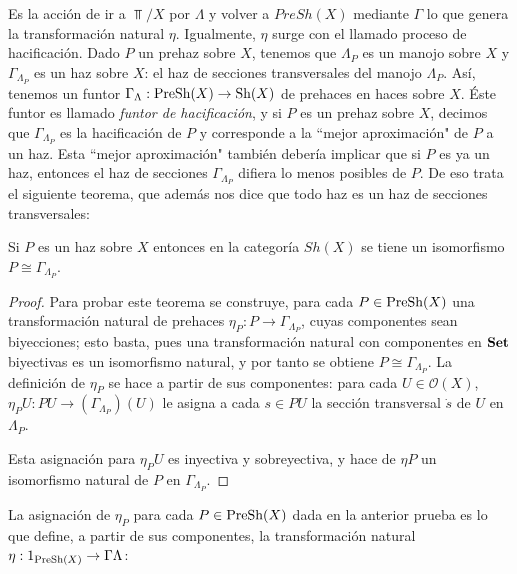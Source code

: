 Es la acción de ir a $\Top/X$ por $\Lambda$ y volver a $PreSh(X)$ mediante $\Gamma$ lo que genera la transformación natural $\eta$. Igualmente, $\eta$ surge con el llamado proceso de hacificación. Dado $P$ un prehaz sobre $X$, tenemos que $\Lambda_P$ es un manojo sobre $X$ y $\Gamma_{\Lambda_P}$ es un haz sobre $X$: el haz de secciones transversales del manojo $\Lambda_P$. Así, tenemos un funtor $\Gamma_\Lambda: \normalfont{\text{PreSh}}(X)\to\normalfont{\text{Sh}}(X)$ de prehaces en haces sobre $X$. Éste funtor es llamado \textit{funtor de hacificación}, y si $P$ es un prehaz sobre $X$, decimos que $\Gamma_{\Lambda_P}$ es la hacificación de $P$ y corresponde a la ``mejor aproximación" de $P$ a un haz. Esta ``mejor aproximación" también debería implicar que si $P$ es ya un haz, entonces el haz de secciones $\Gamma_{\Lambda_P}$ difiera lo menos posibles de $P$. De eso trata el siguiente teorema, que además nos dice que todo haz es un haz de secciones transversales:
\begin{Tma}
   Si $P$ es un haz sobre $X$ entonces en la categoría $Sh(X)$ se tiene un isomorfismo $P\cong \Gamma_{\Lambda_P}$.
\end{Tma}
\begin{proof}
   Para probar este teorema se construye, para cada $P\in \normalfont{\text{PreSh}}(X)$ una transformación natural de prehaces $\eta_{P}:P\to\Gamma_{\Lambda_P}$, cuyas componentes sean biyecciones; esto basta, pues una transformación natural con componentes en $\normalfont{\textbf{Set}}$ biyectivas es un isomorfismo natural, y por tanto se obtiene $P\cong \Gamma_{\Lambda_P}$. La definición de $\eta_P$ se hace a partir de sus componentes: para cada $U\in \mathcal{O}(X)$, $\eta_{P} U:PU\to (\Gamma_{\Lambda_P})(U)$ le asigna a cada $s\in PU$ la sección transversal $\dot{s}$ de $U$ en $\Lambda_P$.
   
   Esta asignación para $\eta_{P}U$ es inyectiva y sobreyectiva, y hace de $\eta P$ un isomorfismo natural de $P$ en $\Gamma_{\Lambda_P}$.
\end{proof}
La asignación de $\eta_P$ para cada $P\in \normalfont{\text{PreSh}} (X)$ dada en la anterior prueba es lo que define, a partir de sus componentes, la transformación natural $\eta :1_{\normalfont{\text{PreSh}}(X)}\to \Gamma \Lambda$:

